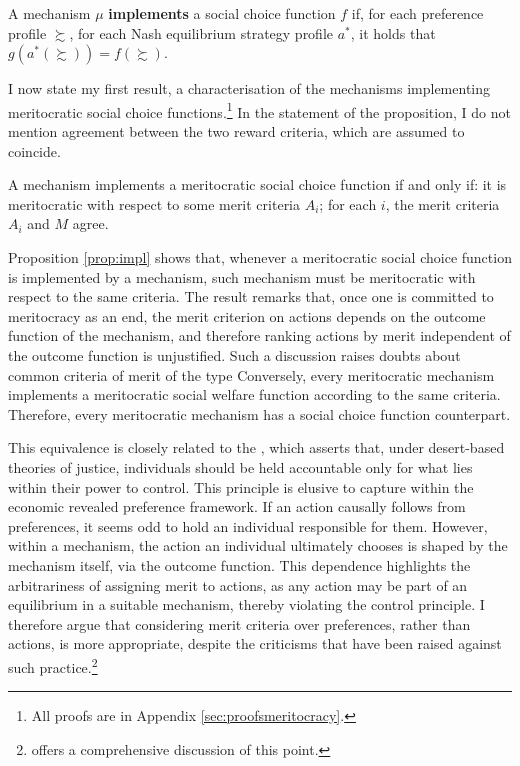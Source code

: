 \begin{definition}
	A mechanism \( \mu \) \textbf{implements} a social choice function \( f \) if, for each preference profile \( \succsim \), for each Nash equilibrium strategy profile \( a^{*} \), it holds that \( g( a^{*} ( \succsim ) ) = f ( \succsim ) \).
\end{definition}

I now state my first result, a characterisation of the mechanisms implementing meritocratic social choice functions.\footnote{All proofs are in Appendix \ref{sec:proofsmeritocracy}.} In the statement of the proposition, I do not mention agreement between the two reward criteria, which are assumed to coincide.

\begin{prop}\label{prop:impl}
	A mechanism implements a meritocratic social choice function if and only if: it is meritocratic with respect to some merit criteria \( A_i \); for each \( i \), the merit criteria \( A_i \) and \( M \) agree.
\end{prop}

Proposition \ref{prop:impl} shows that, whenever a meritocratic social choice function is implemented by a mechanism, such mechanism must be meritocratic with respect to the same criteria. The result remarks that, once one is committed to meritocracy as an end, the merit criterion on actions depends on the outcome function of the mechanism, and therefore ranking actions by merit independent of the outcome function is unjustified. Such a discussion raises doubts about common criteria of merit of the type  Conversely, every meritocratic mechanism implements a meritocratic social welfare function according to the same criteria. Therefore, every meritocratic mechanism has a social choice function counterpart.

This equivalence is closely related to the  \citep{arnesonDesertEquality2007,fleurbaeyFairnessResponsibilityWelfare2008}, which asserts that, under desert-based theories of justice, individuals should be held accountable only for what lies within their power to control. This principle is elusive to capture within the economic revealed preference framework. If an action causally follows from preferences, it seems odd to hold an individual responsible for them. However, within a mechanism, the action an individual ultimately chooses is shaped by the mechanism itself, via the outcome function. This dependence highlights the arbitrariness of assigning merit to actions, as any action may be part of an equilibrium in a suitable mechanism, thereby violating the control principle. I therefore argue that considering merit criteria over preferences, rather than actions, is more appropriate, despite the criticisms that have been raised against such practice.\footnote{\citet[ch. 10]{fleurbaeyFairnessResponsibilityWelfare2008} offers a comprehensive discussion of this point.}

